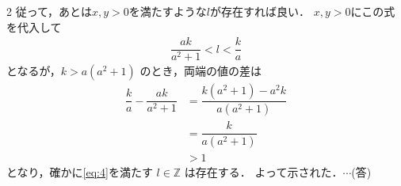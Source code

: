 \documentclass[../../main.tex]{subfiles}
\begin{document}
\begin{multicols}{2}
  従って，あとは$x,y>0$を満たすような$l$が存在すれば良い．
  $x,y>0$にこの式を代入して
  \begin{align}
    \dfrac{ak}{a^2+1} < l < \dfrac{k}{a}  \label{eq:4}
  \end{align}
  となるが，$k> a(a^2+1)$ のとき，両端の値の差は
  \begin{align}
    \dfrac{k}{a} - \dfrac{ak}{a^2+1}
    & = \dfrac{k(a^2+1) - a^2k}{a(a^2+1)} \\
    & = \dfrac{k}{a(a^2+1)}               \\
    & > 1
  \end{align}
  となり，確かに\cref{eq:4}を満たす $l \in \mathbb{Z}$ は存在する．
  よって示された．$\cdots$(答)

  \newpage
\end{multicols}
\end{document}
